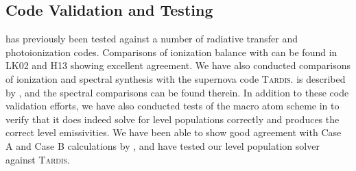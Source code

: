 \documentclass[preprint, a4paper, 11pt]{aastex}
\begin{document}
\subsection{Code Validation and Testing}

\py has previously been tested against a number of radiative transfer and
photoionization codes. Comparisons of ionization balance with \cld \citep{cloudy2013} 
can be found in LK02 and H13 showing excellent agreement. We have also conducted comparisons
of ionization and spectral synthesis with the supernova code \textsc{Tardis.} \tar is described by
\cite{kerzendorfsim}, and the spectral comparisons can be found therein.
In addition to these code validation efforts, we have also conducted tests of
the macro atom scheme in \py to verify that it does indeed solve for level populations correctly
and produces the correct level emissivities. We have been able to show good agreement with 
Case A and Case B calculations by \cite{seaton1959}, and have tested our level
population solver against \textsc{Tardis.}







\end{document}
